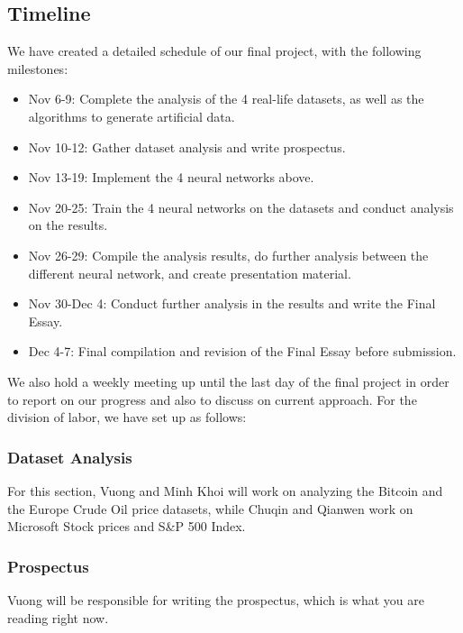 \documentclass[letterpaper, 10 pt, conference]{ieeeconf}  %
\begin{document}
    \subsection{Timeline}
    We have created a detailed schedule of our final project, with the following milestones:
    \begin{itemize}
        \item Nov 6-9: Complete the analysis of the 4 real-life datasets, as well as the algorithms to generate artificial data.
        \item Nov 10-12: Gather dataset analysis and write prospectus.
        \item Nov 13-19: Implement the 4 neural networks above.
        \item Nov 20-25: Train the 4 neural networks on the datasets and conduct analysis on the results.
        \item Nov 26-29: Compile the analysis results, do further analysis between the different neural network, and create presentation material.
        \item Nov 30-Dec 4: Conduct further analysis in the results and write the Final Essay.
        \item Dec 4-7: Final compilation and revision of the Final Essay before submission. 
    \end{itemize}

    We also hold a weekly meeting up until the last day of the final project in order to report on our progress and also to discuss on current approach. For the division of labor, we have set up as follows:

    \subsubsection{Dataset Analysis} For this section, Vuong and Minh Khoi will work on analyzing the Bitcoin and the Europe Crude Oil price datasets, while Chuqin and Qianwen work on Microsoft Stock prices and S\&P 500 Index.

    \subsubsection{Prospectus} Vuong will be responsible for writing the prospectus, which is what you are reading right now.
\end{document}
